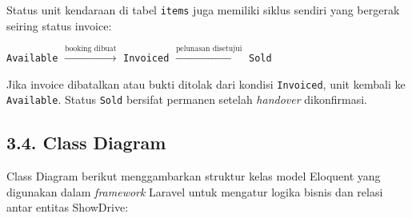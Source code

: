 \documentclass[11pt, a5paper]{article}
\begin{document}
Status unit kendaraan di tabel \texttt{items} juga memiliki siklus sendiri yang
bergerak seiring status invoice:

\begin{center}
\texttt{Available} $\xrightarrow{\text{booking dibuat}}$
\texttt{Invoiced} $\xrightarrow{\text{pelunasan disetujui}}$
\texttt{Sold}
\end{center}

\vspace{0.3cm}
Jika invoice dibatalkan atau bukti ditolak dari kondisi \texttt{Invoiced}, unit
kembali ke \texttt{Available}. Status \texttt{Sold} bersifat permanen setelah
\textit{handover} dikonfirmasi.

\subsection*{3.4. Class Diagram}

Class Diagram berikut menggambarkan struktur kelas model Eloquent yang
digunakan dalam \textit{framework} Laravel untuk mengatur logika bisnis dan
relasi antar entitas ShowDrive:
\end{document}
